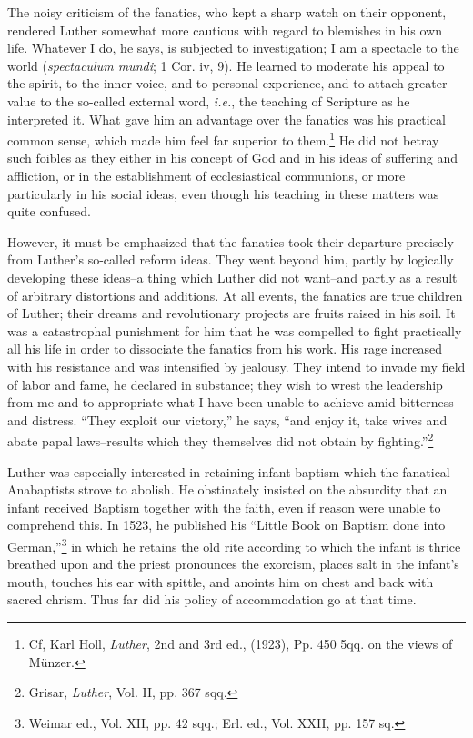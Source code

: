 The noisy criticism of the fanatics, who kept a sharp watch on
their opponent, rendered Luther somewhat more cautious with regard to
blemishes in his own life. Whatever I do, he says, is subjected
to investigation; I am a spectacle to the world (\textit{spectaculum mundi};
1 Cor. iv, 9). He learned to moderate his appeal to the spirit, to
the inner voice, and to personal experience, and to attach greater
value to the so-called external word, \textit{i.e.}, the teaching of Scripture
as he interpreted it. What gave him an advantage over the fanatics
was his practical common sense, which made him feel far superior to
them.\footnote{Cf, Karl Holl, \textit{Luther}, 2nd and 3rd ed., (1923), Pp. 450 5qq. on the views of Münzer.}
He did not betray such foibles as they either in his concept
of God and in his ideas of suffering and affliction, or in the
establishment of ecclesiastical communions, or more particularly in his
social ideas, even though his teaching in these matters was quite confused.

However, it must be emphasized that the fanatics took their departure
precisely from Luther’s so-called reform ideas. They went beyond him,
partly by logically developing these ideas--a thing which
Luther did not want--and partly as a result of arbitrary distortions
and additions. At all events, the fanatics are true children of Luther;
their dreams and revolutionary projects are fruits raised in his soil.
It was a catastrophal punishment for him that he was compelled to
fight practically all his life in order to dissociate the fanatics from
his work. His rage increased with his resistance and was intensified
by jealousy. They intend to invade my field of labor and fame, he
declared in substance; they wish to wrest the leadership from me and
to appropriate what I have been unable to achieve amid bitterness and
distress. “They exploit our victory,” he says, “and enjoy it, take wives
and abate papal laws--results which they themselves did not obtain
by fighting.”\footnote{Grisar, \textit{Luther}, Vol. II, pp. 367 sqq.}

Luther was especially interested in retaining infant baptism which
the fanatical Anabaptists strove to abolish. He obstinately insisted
on the absurdity that an infant received Baptism together with the
faith, even if reason were unable to comprehend this. In 1523, he
published his “Little Book on Baptism done into German,”\footnote
{Weimar ed., Vol. XII, pp. 42 sqq.; Erl. ed., Vol. XXII, pp. 157 sq.}
in which he retains the old rite according to which the infant is thrice
breathed upon and the priest pronounces the exorcism, places salt
in the infant’s mouth, touches his ear with spittle, and anoints him
on chest and back with sacred chrism. Thus far did his policy of
accommodation go at that time.

